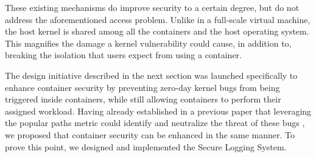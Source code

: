 These existing mechanisms do improve security to a certain degree, but do not address the aforementioned access problem. 
Unlike in a full-scale virtual machine, the host kernel is shared among all the containers and the host operating system. 
This magnifies the damage a kernel vulnerability could cause, in addition to, breaking the isolation that users expect from using a container. 

The design initiative  described in the next section was launched specifically to enhance container security by preventing zero-day kernel bugs from being triggered inside containers, 
while still allowing containers to perform their assigned  workload. Having already established in a previous paper that leveraging the popular paths metric could identify and neutralize the threat of these bugs \cite{Lock-in-Pop}, 
we proposed that container security can be enhanced in the same manner. To prove this point, we designed and implemented the Secure Logging System. 